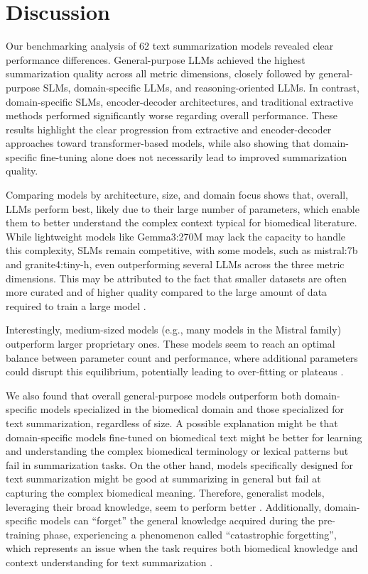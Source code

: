 \section{Discussion}

Our benchmarking analysis of 62 text summarization models revealed clear performance differences. General-purpose \acp{LLM} achieved the highest summarization quality across all metric dimensions, closely followed by general-purpose \acp{SLM}, domain-specific \acp{LLM}, and reasoning-oriented \acp{LLM}. In contrast, domain-specific \acp{SLM}, encoder-decoder architectures, and traditional extractive methods performed significantly worse regarding overall performance. These results highlight the clear progression from extractive and encoder-decoder approaches toward transformer-based models, while also showing that domain-specific fine-tuning alone does not necessarily lead to improved summarization quality.

Comparing models by architecture, size, and domain focus shows that, overall, \acp{LLM} perform best, likely due to their large number of parameters, which enable them to better understand the complex context typical for biomedical literature. While lightweight models like Gemma3:270M may lack the capacity to handle this complexity, \acp{SLM} remain competitive, with some models, such as mistral:7b and granite4:tiny-h, even outperforming several \acp{LLM} across the three metric dimensions. This may be attributed to the fact that smaller datasets are often more curated and of higher quality compared to the large amount of data required to train a large model \cite{xu2025evaluatingsmalllanguagemodels}. 

Interestingly, medium-sized models (e.g., many models in the Mistral family) outperform larger proprietary ones. These models seem to reach an optimal balance between parameter count and performance, where additional parameters could disrupt this equilibrium, potentially leading to over‑fitting or plateaus \cite{muennighoff2025scalingdataconstrainedlanguagemodels}.

We also found that overall general-purpose models outperform both domain-specific models specialized in the biomedical domain and those specialized for text summarization, regardless of size. A possible explanation might be that domain-specific models fine-tuned on biomedical text might be better for learning and understanding the complex biomedical terminology or lexical patterns but fail in summarization tasks. On the other hand, models specifically designed for text summarization might be good at summarizing in general but fail at capturing the complex biomedical meaning. Therefore, generalist models, leveraging their broad knowledge, seem to perform better \cite{dorfner2024biomedicallargelanguagesmodels}. Additionally, domain-specific models can “forget” the general knowledge acquired during the pre-training phase, experiencing a phenomenon called “catastrophic forgetting”, which represents an issue when the task requires both biomedical knowledge and context understanding for text summarization \cite{zhou2025internal}.

